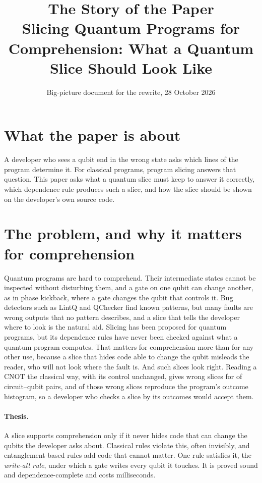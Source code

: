 \documentclass[10pt]{article}
\title{The Story of the Paper\\[2pt]\large Slicing Quantum Programs for Comprehension: What a Quantum Slice Should Look Like}
\date{Big-picture document for the rewrite, 28 October 2026}
\begin{document}
\maketitle

\section*{What the paper is about}
A developer who sees a qubit end in the wrong state asks which lines of the program determine it. For
classical programs, program slicing answers that question. This paper asks what a quantum slice must keep
to answer it correctly, which dependence rule produces such a slice, and how the slice should be shown on the
developer's own source code.

\section*{The problem, and why it matters for comprehension}
Quantum programs are hard to comprehend. Their intermediate states cannot be inspected without disturbing
them, and a gate on one qubit can change another, as in phase kickback, where a gate changes the qubit that
controls it. Bug detectors such as LintQ and QChecker find known patterns, but many faults are wrong outputs
that no pattern describes, and a slice that tells the developer where to look is the natural aid.
Slicing has been proposed for quantum programs, but its dependence rules have never been checked against
what a quantum program computes. That matters for comprehension more than for any other use, because a
slice that hides code able to change the qubit misleads the reader, who will not look where the fault is.
And such slices look right. Reading a CNOT the classical way, with its control unchanged, gives wrong slices
for \numCpdgUnsoundPct{} of \numNPairs{} circuit--qubit pairs, and \numFdCpdgZMatchPct{} of those wrong
slices reproduce the program's outcome histogram, so a developer who checks a slice by its outcomes would
accept them.

\paragraph{Thesis.} A slice supports comprehension only if it never hides code that can change the qubits the
developer asks about. Classical rules violate this, often invisibly, and entanglement-based rules add code
that cannot matter. One rule satisfies it, the \emph{write-all rule}, under which a gate writes every qubit
it touches. It is proved sound and dependence-complete and costs milliseconds.
\end{document}
